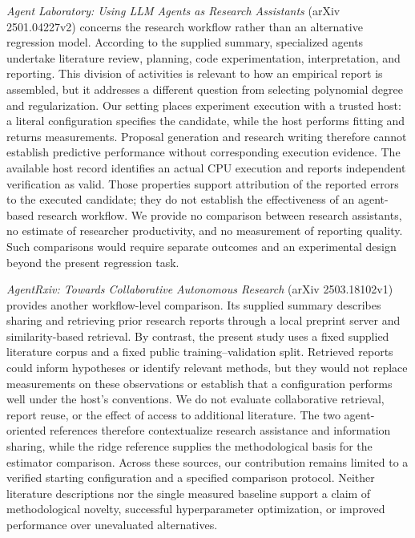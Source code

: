 \documentclass[11pt]{article}
\begin{document}
\textit{Agent Laboratory: Using LLM Agents as Research Assistants} (arXiv 2501.04227v2) concerns the research workflow rather than an alternative regression model. According to the supplied summary, specialized agents undertake literature review, planning, code experimentation, interpretation, and reporting. This division of activities is relevant to how an empirical report is assembled, but it addresses a different question from selecting polynomial degree and regularization. Our setting places experiment execution with a trusted host: a literal configuration specifies the candidate, while the host performs fitting and returns measurements. Proposal generation and research writing therefore cannot establish predictive performance without corresponding execution evidence. The available host record identifies an actual CPU execution and reports independent verification as valid. Those properties support attribution of the reported errors to the executed candidate; they do not establish the effectiveness of an agent-based research workflow. We provide no comparison between research assistants, no estimate of researcher productivity, and no measurement of reporting quality. Such comparisons would require separate outcomes and an experimental design beyond the present regression task.

\textit{AgentRxiv: Towards Collaborative Autonomous Research} (arXiv 2503.18102v1) provides another workflow-level comparison. Its supplied summary describes sharing and retrieving prior research reports through a local preprint server and similarity-based retrieval. By contrast, the present study uses a fixed supplied literature corpus and a fixed public training--validation split. Retrieved reports could inform hypotheses or identify relevant methods, but they would not replace measurements on these observations or establish that a configuration performs well under the host's conventions. We do not evaluate collaborative retrieval, report reuse, or the effect of access to additional literature. The two agent-oriented references therefore contextualize research assistance and information sharing, while the ridge reference supplies the methodological basis for the estimator comparison. Across these sources, our contribution remains limited to a verified starting configuration and a specified comparison protocol. Neither literature descriptions nor the single measured baseline support a claim of methodological novelty, successful hyperparameter optimization, or improved performance over unevaluated alternatives.
\end{document}

